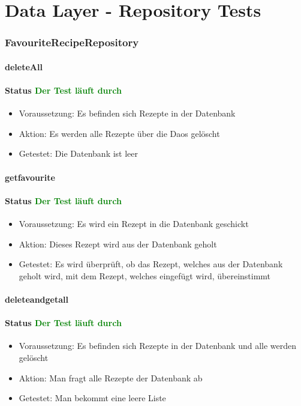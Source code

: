 \chapter{Data Layer - Repository Tests}

\subsection{FavouriteRecipeRepository}

\subsubsection{deleteAll}
\subsubsection{Status \textcolor{green}{ Der Test läuft durch} }
\begin{itemize}
	\item Voraussetzung: Es befinden sich Rezepte in der Datenbank
	\item Aktion: Es werden alle Rezepte über die Daos gelöscht
	\item Getestet: Die Datenbank ist leer
\end{itemize}


\subsubsection{getfavourite}
\subsubsection{Status \textcolor{green}{ Der Test läuft durch} }
\begin{itemize}
	\item Voraussetzung: Es wird ein Rezept in die Datenbank geschickt
	\item Aktion: Dieses Rezept wird aus der Datenbank geholt
	\item Getestet: Es wird überprüft, ob das Rezept, welches aus der Datenbank geholt wird, mit dem Rezept, welches eingefügt wird, übereinstimmt
\end{itemize}


\subsubsection{deleteandgetall}
\subsubsection{Status \textcolor{green}{ Der Test läuft durch} }
\begin{itemize}
	\item Voraussetzung: Es befinden sich Rezepte in der Datenbank und alle werden gelöscht
	\item Aktion: Man fragt alle Rezepte der Datenbank ab
	\item Getestet: Man bekommt eine leere Liste
\end{itemize}


